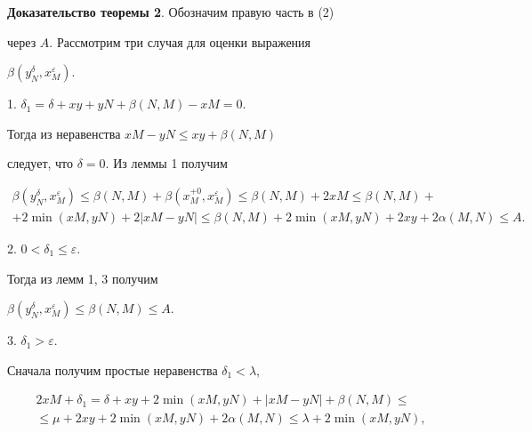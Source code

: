 {\bf Доказательство теоремы 2}. Обозначим правую часть в (2) 


через $A$. Рассмотрим три случая для оценки выражения 


$\beta (y_{N}^{\delta },x_{M}^{\varepsilon })$.





1. $\delta_{1} = \delta + xy + yN + \beta (N,M) - xM = 0$.





Тогда из неравенства $xM - yN \leq xy + \beta (N,M)$ 


следует, что $\delta = 0$. Из леммы 1 получим


\begin{multline*}


\beta (y_{N}^{\delta },x_{M}^{\varepsilon }) \leq


\beta (N,M) + \beta (x_{M}^{+0},x_{M}^{\varepsilon }) \leq 


\beta (N,M) + 2xM \leq


\beta (N,M) + \\ + 2\min (xM,yN) + 2|xM - yN| \leq


\beta (N,M) + 2\min (xM,yN) + 2xy + 2\alpha (M,N) 


\leq A.


\end{multline*}





2. $0 < \delta_{1} \leq \varepsilon $. 


Тогда из лемм 1, 3 получим


$\beta (y_{N}^{\delta },x_{M}^{\varepsilon }) \leq \beta (N,M) \leq A$.





3. $\delta_{1} > \varepsilon $.


Сначала получим простые неравенства $\delta_{1} < \lambda$, 


\begin{multline*}


2xM+\delta_{1} = \delta + xy + 2\min (xM,yN) + |xM - yN| + \beta (N,M)\leq\\


\le \mu + 2xy


+ 2\min (xM,yN) + 2\alpha (M,N) \leq \lambda + 2\min (xM,yN),


\end{multline*}



